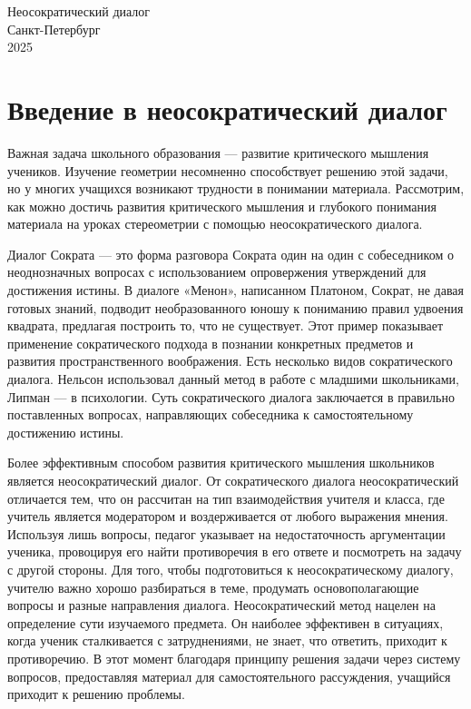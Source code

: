 \documentclass[a4paper,14pt,russian]{extreport}
\renewenvironment{titlepage}{%
    \thispagestyle{empty} %
    \setcounter{page}{1} %
    \cleardoublepage

    
}{%
    
    \vfil\null
    \cleardoublepage
}
\begin{document}
\begin{titlepage}

\begin{center}

\LARGE Неосократический диалог
\\Санкт-Петербург
\\2025
\end{center}

\end{titlepage}
\tableofcontents
\pagestyle{plain}

\newpage

\chapter*{Введение в неосократический диалог}    



Важная задача школьного образования — развитие критического мышления учеников. Изучение геометрии несомненно способствует решению этой задачи, но у многих учащихся возникают трудности в понимании материала.  Рассмотрим, как можно достичь развития критического мышления и глубокого понимания материала на уроках стереометрии с помощью неосократического диалога.

Диалог Сократа — это форма разговора Сократа один на один с собеседником о неоднозначных вопросах с использованием опровержения утверждений для достижения истины. В диалоге «Менон», написанном Платоном, Сократ, не давая готовых знаний, подводит необразованного юношу к пониманию правил удвоения квадрата, предлагая построить то, что не существует. Этот пример показывает применение сократического подхода в познании конкретных предметов и развития пространственного воображения.
Есть несколько видов сократического диалога. Нельсон использовал данный метод в работе с младшими школьниками, Липман — в психологии. Суть сократического диалога заключается в правильно поставленных вопросах, направляющих собеседника к самостоятельному достижению истины.


Более эффективным способом развития критического мышления школьников является неосократический диалог. От сократического диалога неосократический отличается тем, что он рассчитан на тип взаимодействия учителя и класса, где учитель является модератором и воздерживается от любого выражения мнения. Используя лишь вопросы, педагог указывает на недостаточность аргументации ученика, провоцируя его найти противоречия в его ответе и посмотреть на задачу с другой стороны. Для того, чтобы подготовиться к неосократическому диалогу, учителю важно хорошо разбираться в теме, продумать основополагающие вопросы и разные направления диалога. Неосократический метод нацелен на определение сути изучаемого предмета. Он наиболее эффективен в ситуациях, когда ученик сталкивается с затруднениями, не знает, что ответить, приходит к противоречию. В этот момент благодаря принципу решения задачи через систему вопросов, предоставляя материал для самостоятельного рассуждения, учащийся приходит к решению проблемы.
\end{document}
